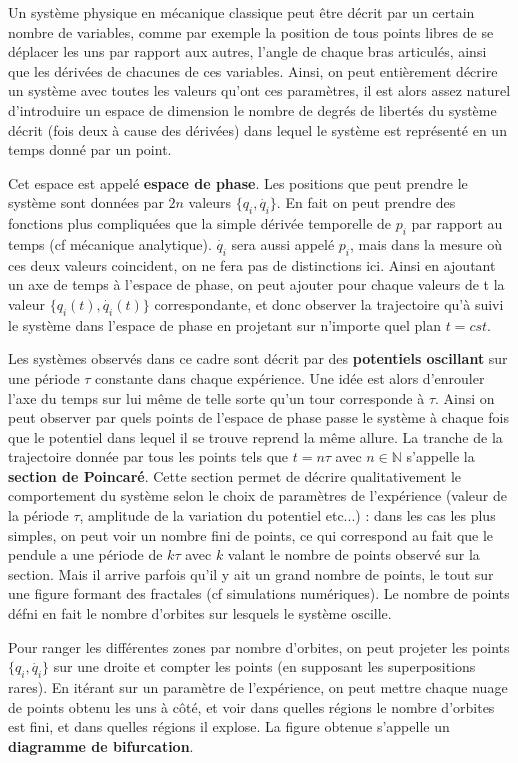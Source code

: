 \documentclass[a4paper,12pt,oneside]{article}
\begin{document}
Un système physique en mécanique classique peut être décrit par un certain nombre de variables, comme par exemple la position de tous points libres de se déplacer les uns par rapport aux autres, l'angle de chaque bras articulés, ainsi que les dérivées de chacunes de ces variables. Ainsi, on peut entièrement décrire un système avec toutes les valeurs qu'ont ces paramètres, il est alors assez naturel d'introduire un espace de dimension le nombre de degrés de libertés du système décrit (fois deux à cause des dérivées) dans lequel le système est représenté en un temps donné par un point.

Cet espace est appelé \textbf{espace de phase}. Les positions que peut prendre le système sont données par $2n$ valeurs $\{q_i,\dot{q_i}\}$. En fait on peut prendre des fonctions plus compliquées que la simple dérivée temporelle de $p_i$ par rapport au temps (cf mécanique analytique). $\dot{q_i}$ sera aussi appelé $p_i$, mais dans la mesure où ces deux valeurs coincident, on ne fera pas de distinctions ici.
Ainsi en ajoutant un axe de temps à l'espace de phase, on peut ajouter pour chaque valeurs de t la valeur $\{q_i(t),\dot{q_i}(t)\}$ correspondante, et donc observer la trajectoire qu'à suivi le système dans l'espace de phase en projetant sur n'importe quel plan $t=cst$.

Les systèmes observés dans ce cadre sont décrit par des \textbf{potentiels oscillant} sur une période $\tau$ constante dans chaque expérience. Une idée est alors d'enrouler l'axe du temps sur lui même de telle sorte qu'un tour corresponde à $\tau$. Ainsi on peut observer par quels points de l'espace de phase passe le système à chaque fois que le potentiel dans lequel il se trouve reprend la même allure. La tranche de la trajectoire donnée par tous les points tels que $t=n\tau$ avec $n\in \mathbb{N}$ s'appelle la \textbf{section de Poincaré}. Cette section permet de décrire qualitativement le comportement du système selon le choix de paramètres de l'expérience (valeur de la période $\tau$, amplitude de la variation du potentiel etc...) : dans les cas les plus simples, on peut voir un nombre fini de points, ce qui correspond au fait que le pendule a une période de $k\tau$ avec $k$ valant le nombre de points observé sur la section. Mais il arrive parfois qu'il y ait un grand nombre de points, le tout sur une figure formant des fractales (cf simulations numériques). Le nombre de points défni en fait le nombre d'orbites sur lesquels le système oscille.

Pour ranger les différentes zones par nombre d'orbites, on peut projeter les points $\{q_i,\dot {q_i}\}$ sur une droite et compter les points (en supposant les superpositions rares). En itérant sur un paramètre de l'expérience, on peut mettre chaque nuage de points obtenu les uns à côté, et voir dans quelles régions le nombre d'orbites est fini, et dans quelles régions il explose. La figure obtenue s'appelle un \textbf{diagramme de bifurcation}.
\end{document}
